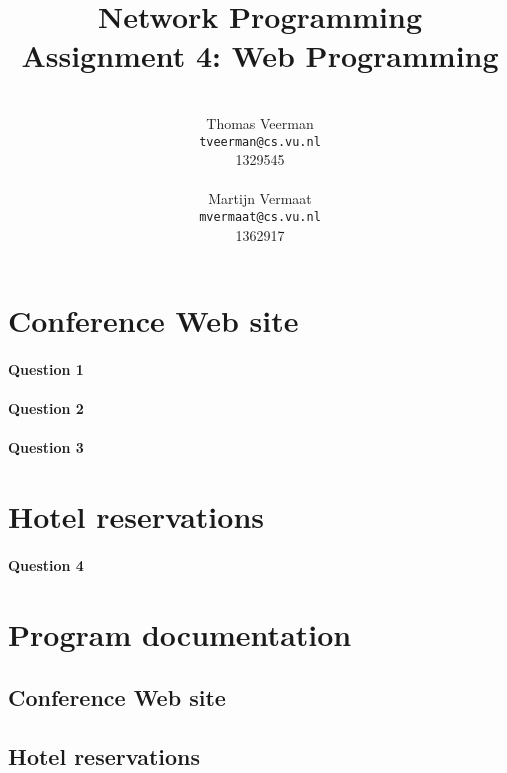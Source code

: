 \documentclass[a4paper,10pt]{article}
\title{Network Programming\\
\small{Assignment 4: Web Programming}}
\author{%
        \mbox{}\\
        Thomas Veerman\\
        \texttt{tveerman@cs.vu.nl}\\
        1329545\\
        \mbox{}\\
        Martijn Vermaat\\
        \texttt{mvermaat@cs.vu.nl}\\
        1362917
}
\begin{document}
\maketitle

\section{Conference Web site}
\paragraph{Question 1}

\paragraph{Question 2}

\paragraph{Question 3}

\section{Hotel reservations}
\paragraph{Question 4}

\section{Program documentation}
\subsection{Conference Web site}

\subsection{Hotel reservations}
\end{document}
